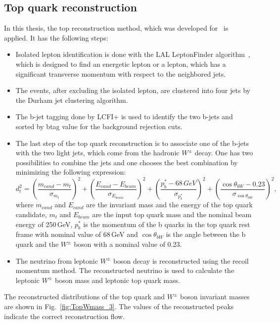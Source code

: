 \subsection{Top quark reconstruction}
In this thesis, the top reconstruction method, which was developed for~\cite{bib:ILCTOP} is applied. It has the following steps:
\begin{itemize}
	\item Isolated lepton identification is done with the LAL LeptonFinder algorithm~\cite{bib:Doublet}, which is designed to find an energetic lepton or a lepton, which has a significant transverse momentum with respect to the neighbored jets. 
	\item The events, after excluding the isolated lepton, are clustered into four jets by the Durham jet clustering algorithm.
	\item The b-jet tagging done by LCFI+ is used to identify the two b-jets and sorted by btag value for the background rejection cuts. 
	\item The last step of the top quark reconstruction is to associate one of the b-jets with the two light jets, which come from the hadronic $W^\pm$ decay.  One has two possibilities to combine the jets and one chooses the best combination by minimizing the following expression:
	\begin{equation}
	\label{formula:Chi2Top_3}
	d^2_{t} = (\frac{m_{cand}-m_{t}}{\sigma_{m_t}})^2 + (\frac{E_{cand}-E_{beam}}{\sigma_{E_{beam}}})^2+(\frac{p^*_b-68\,GeV}{\sigma_{p^*_b}})^2 + (\frac{\cos\theta_{bW}-0.23}{\sigma_{\cos\theta_{bW}}})^2,
	\end{equation}
	where $m_{cand}$ and $E_{cand}$ are the invariant mass and the energy of the top quark candidate, $m_t$ and $E_{beam}$ are the input top quark mass and the nominal beam energy of 250\,GeV, $p^*_b$ is the momentum of the b quarks in the top quark rest frame with nominal value of 68\,GeV and $\cos\theta_{bW}$ is the angle between the b quark and the $W^\pm$ boson with a nominal value of 0.23.
	\item The neutrino from leptonic $W^\pm$ boson decay is reconstructed using the recoil momentum method. The reconstructed neutrino is used to calculate the leptonic $W^\pm$ boson mass and leptonic top quark mass. 
\end{itemize}

The reconstructed distributions of the top quark and $W^\pm$ boson invariant masses are shown in Fig.~\ref{fig:TopWmass_3}. The values of the reconstructed peaks indicate the correct reconstruction flow. 

